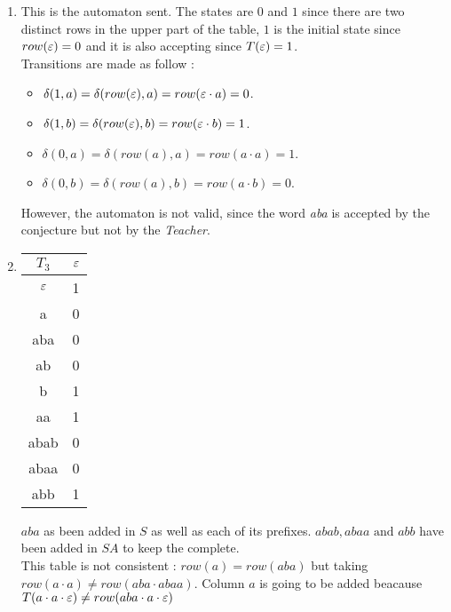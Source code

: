 \begin{enumerate}
  \item \begin{minipage}{0.3\textwidth}
          
        \end{minipage}\quad
        \begin{minipage}{0.6\textwidth}
          This is the automaton sent.
          The states are $0$ and $1$ since there are two distinct rows in the upper part of the table, $1$ is the initial state since $row(\varepsilon) = 0$ and it is also accepting since $T(\varepsilon) = 1$.\\
          Transitions are made as follow : \\
          \begin{itemize}
            \item $\delta(1, a) = \delta(row(\varepsilon), a) = row(\varepsilon \cdot a) = 0$.
            \item $\delta(1, b) = \delta(row(\varepsilon), b) = row(\varepsilon \cdot b) =  1$.
            \item $\delta(0, a) = \delta(row(a), a) = row(a \cdot a) =  1$.
            \item $\delta(0, b) = \delta(row(a), b) = row(a \cdot b) = 0$.
          \end{itemize}
          However, the automaton is not valid, since the word \textit{aba} is accepted by the conjecture but not by the \textit{Teacher}.
        \end{minipage}

  \item \begin{minipage}{0.3\textwidth}
          \begin{tabular}{c||c}
            $T_3$ & $\varepsilon$ \\
            \hline\hline
            $\varepsilon$  & 1    \\
            a     & 0    \\
            aba   & 0    \\
            ab    & 0    \\
            \hline\hline
            b     & 1    \\
            aa    & 1    \\
            abab  & 0    \\
            abaa  & 0    \\
            abb   & 1    \\
          \end{tabular}
        \end{minipage} \quad
        \begin{minipage}{0.5\textwidth}
          $aba$ as been added in $S$ as well as each of its prefixes. $abab, abaa \text{ and } abb$ have been added in $SA$ to keep the \OT complete. \\
          This table is not consistent : $row(a) = row(aba)$ but taking $row(a \cdot a) \neq row(aba \cdot abaa)$. Column $a$ is going to be added beacause $T(a \cdot a \cdot \varepsilon) \neq row(aba \cdot a \cdot \varepsilon)$
        \end{minipage}


\end{enumerate}
